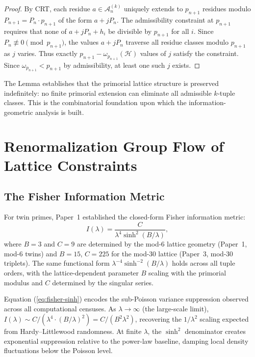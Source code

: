 \documentclass[11pt]{article}
\theoremstyle{remark}
\begin{document}
\begin{proof}
By CRT, each residue $a \in \mathcal{A}_n^{(k)}$ uniquely extends to
$p_{n+1}$ residues modulo $P_{n+1} = P_n \cdot p_{n+1}$ of the form
$a + j P_n$. The admissibility constraint at $p_{n+1}$ requires that
none of $a + j P_n + h_i$ be divisible by $p_{n+1}$ for all $i$.
Since $P_n \not\equiv 0 \pmod{p_{n+1}}$, the values $a + j P_n$
traverse all residue classes modulo $p_{n+1}$ as $j$ varies. Thus
exactly $p_{n+1} - \omega_{p_{n+1}}(\mathcal{H})$ values of $j$
satisfy the constraint. Since $\omega_{p_{n+1}} < p_{n+1}$ by
admissibility, at least one such $j$ exists.
\end{proof}

The Lemma establishes that the primorial lattice structure is preserved
indefinitely: no finite primorial extension can eliminate all admissible
$k$-tuple classes. This is the combinatorial foundation upon which the
information-geometric analysis is built.

\section{Renormalization Group Flow of Lattice Constraints}

\subsection{The Fisher Information Metric}

For twin primes, Paper~1 established the closed-form Fisher information
metric:
\begin{equation}
I(\lambda) = \frac{C}{\lambda^4 \sinh^2(B/\lambda)},
\label{eq:fisher-sinh}
\end{equation}
where $B = 3$ and $C = 9$ are determined by the mod-6 lattice
geometry (Paper~1, mod-6 twins) and $B = 15$, $C = 225$ for the
mod-30 lattice (Paper~3, mod-30 triplets). The same functional form
$\lambda^{-4} \sinh^{-2}(B/\lambda)$ holds across all tuple orders,
with the lattice-dependent parameter $B$ scaling with the primorial
modulus and $C$ determined by the singular series.

Equation (\ref{eq:fisher-sinh}) encodes the sub-Poisson variance
suppression observed across all computational censuses. As $\lambda \to
\infty$ (the large-scale limit), $I(\lambda) \sim C/(\lambda^4 \cdot
(B/\lambda)^2) = C/(B^2 \lambda^2)$, recovering the $1/\lambda^2$
scaling expected from Hardy--Littlewood randomness. At finite $\lambda$,
the $\sinh^2$ denominator creates exponential suppression relative to
the power-law baseline, damping local density fluctuations below the
Poisson level.
\end{document}
